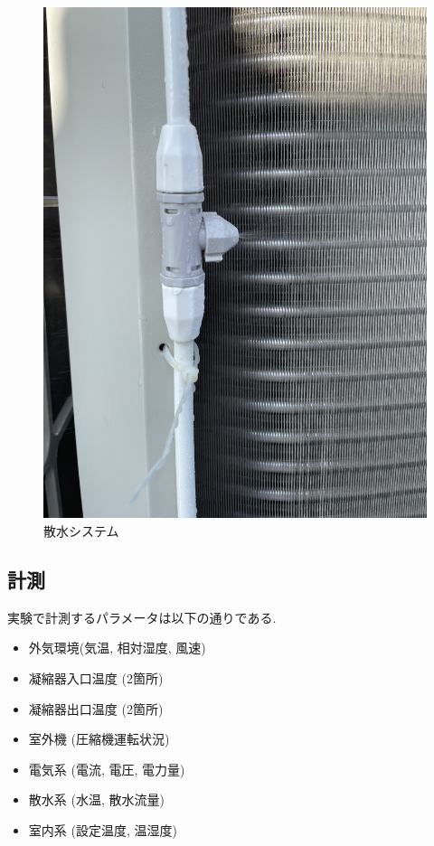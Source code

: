 \documentclass[a4j,fleqn,dvipdfmx,uplatex]{jsarticle}
\begin{document}
\begin{figure}[htb]
\begin{minipage}[b]{0.45\linewidth}
      \centering
      \includegraphics[width=\linewidth]{img/IMG_0142.jpg}
    \end{minipage}
  \caption{散水システム}
  \label{fig2:watering_sys}
\end{figure}

\subsection{計測}
実験で計測するパラメータは以下の通りである. 

\begin{itemize}
  \item 外気環境(気温, 相対湿度, 風速)
  \item 凝縮器入口温度 (2箇所)
  \item 凝縮器出口温度 (2箇所)
  \item 室外機 (圧縮機運転状況)
  \item 電気系 (電流, 電圧, 電力量)
  \item 散水系 (水温, 散水流量)
  \item 室内系 (設定温度, 温湿度)
\end{itemize}
\end{document}
